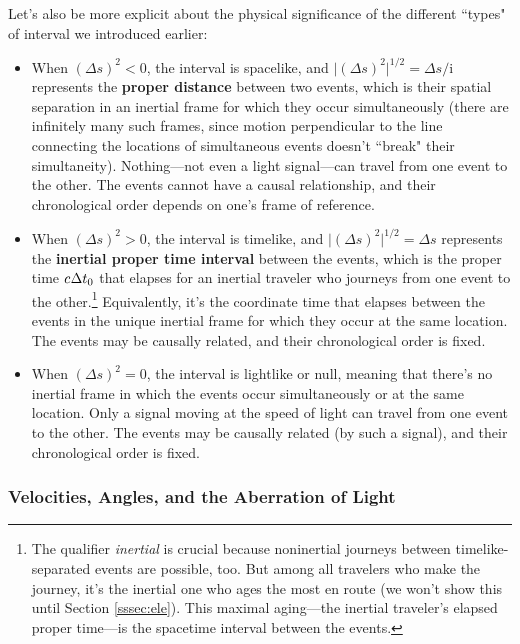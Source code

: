\documentclass[12pt]{article}
\begin{document}
Let's also be more explicit about the physical significance of the different ``types" of interval we introduced earlier:
\begin{itemize}
\item When $(\Delta s)^2<0$, the interval is spacelike, and $\lvert (\Delta s)^2 \rvert ^{1/2} = \Delta s / \mathrm{i}$ represents the \textbf{proper distance} between two events, which is their spatial separation in an inertial frame for which they occur simultaneously (there are infinitely many such frames, since motion perpendicular to the line connecting the locations of simultaneous events doesn't ``break" their simultaneity). Nothing---not even a light signal---can travel from one event to the other. The events cannot have a causal relationship, and their chronological order depends on one's frame of reference.
\item When $(\Delta s)^2>0$, the interval is timelike, and $\lvert(\Delta s)^2\rvert ^{1/2} = \Delta s $ represents the \textbf{inertial proper time interval} between the events, which is the proper time $c \mkern.5mu \Delta t_0$ that elapses for an inertial traveler who journeys from one event to the other.\footnote{\label{fn:pma}The qualifier \emph{inertial} is crucial because noninertial journeys between timelike-separated events are possible, too. But among all travelers who make the journey, it's the inertial one who ages the most en route (we won't show this until Section \ref{sssec:ele}). This maximal aging---the inertial traveler's elapsed proper time---is the spacetime interval between the events.} Equivalently, it's the coordinate time that elapses between the events in the unique inertial frame for which they occur at the same location. The events may be causally related, and their chronological order is fixed.
\item When $(\Delta s)^2=0$, the interval is lightlike or null, meaning that there's no inertial frame in which the events occur simultaneously or at the same location. Only a signal moving at the speed of light can travel from one event to the other. The events may be causally related (by such a signal), and their chronological order is fixed.
\end{itemize}


\subsubsection{Velocities, Angles, and the Aberration of Light}\label{sssec:va}
\end{document}
